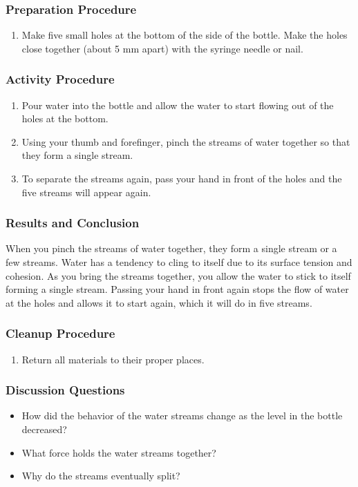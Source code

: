 \subsubsection*{Preparation Procedure}
\begin{enumerate}
\item{Make five small holes at the bottom of the side of the bottle.  Make the holes close together (about 5 mm apart) with the syringe needle or nail.}
\end{enumerate}

\subsubsection*{Activity Procedure}
\begin{enumerate}
\item{Pour water into the bottle and allow the water to start flowing out of the holes at the bottom.}
\item{Using your thumb and forefinger, pinch the streams of water together so that they form a single stream.}
\item{To separate the streams again, pass your hand in front of the holes and the five streams will appear again.}
\end{enumerate}

\subsubsection*{Results and Conclusion}
When you pinch the streams of water together, they form a single stream or a few streams.  Water has a tendency to cling to itself due to its surface tension and cohesion. As you bring the streams together, you allow the water to stick to itself forming a single stream. Passing your hand in front again stops the flow of water at the holes and allows it to start again, which it will do in five streams.

\subsubsection*{Cleanup Procedure}
\begin{enumerate}
\item{Return all materials to their proper places.}
\end{enumerate}

\subsubsection*{Discussion Questions}
\begin{itemize}
\item{How did the behavior of the water streams change as the level in the bottle decreased?}
\item{What force holds the water streams together?}
\item{Why do the streams eventually split?}
\end{itemize}


